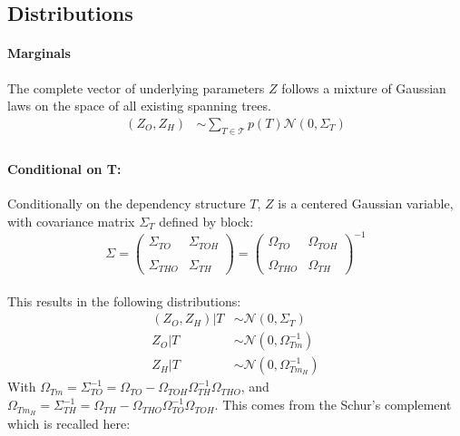\documentclass[11pt,a4paper]{article}
\begin{document}
\subsection{Distributions}
\paragraph{Marginals}
The complete vector of underlying parameters $Z$ follows a mixture of Gaussian laws on the space of all existing spanning trees.
\begin{align*}
(Z_O,Z_H) &\sim \sum_{T \in \mathcal{T}} p(T) \mathcal{N}(0,\Sigma_T) \\
\end{align*}

\paragraph{Conditional on T:}
Conditionally on the dependency structure $T$, $Z$ is a centered Gaussian variable, with covariance matrix $\Sigma_T$ defined by block:
\[
 \Sigma=
  \left( {\begin{array}{cc}
  \Sigma_{TO} &  \Sigma_{TOH}\\\\
  \Sigma_{THO} & \Sigma_{TH}
  \end{array} } \right) =
   \left( {\begin{array}{cc}
  \Omega_{TO} &  \Omega_{TOH}\\\\
  \Omega_{THO} & \Omega_{TH}
  \end{array} } \right)^{-1}
  \]\\
This results in the following distributions:
\begin{align*}
(Z_O,Z_H)|T & \sim\mathcal{N}(0,\Sigma_T)\\
Z_O|T & \sim\mathcal{N}(0,\Omega_{Tm}^{-1})\\
Z_H|T & \sim\mathcal{N}(0,\Omega_{Tm_H}^{-1})
\end{align*}
With $ \Omega_{Tm} =\Sigma_{TO}^{-1} =  \Omega_{TO} - \Omega_{TOH}\Omega_{TH}^{-1}\Omega_{THO}$, and $\Omega_{Tm_H} = \Sigma_{TH}^{-1} = \Omega_{TH} - \Omega_{THO} \Omega_{TO}^{-1} \Omega_{TOH}$. This comes from the Schur's complement which is recalled here:
\end{document}
